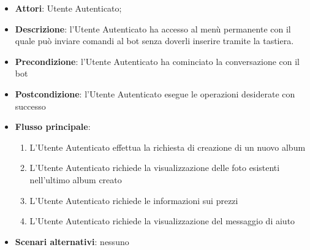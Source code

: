 \begin{itemize}
  \item \textbf{Attori}: Utente Autenticato;
  \item \textbf{Descrizione}: l'Utente Autenticato ha accesso al menù
permanente con il quale può inviare comandi al bot senza doverli inserire
tramite la tastiera.
  \item \textbf{Precondizione}: l'Utente Autenticato ha cominciato la
conversazione con il bot
  \item \textbf{Postcondizione}: l'Utente Autenticato esegue le operazioni
desiderate con successo
  \item \textbf{Flusso principale}:
  \begin{enumerate}
    \item L'Utente Autenticato effettua la richiesta di creazione di un nuovo
album
    \item L'Utente Autenticato richiede la visualizzazione delle foto esistenti
nell'ultimo album creato
    \item L'Utente Autenticato richiede le informazioni sui prezzi
    \item L'Utente Autenticato richiede la visualizzazione del messaggio di
aiuto
  \end{enumerate}
  \item \textbf{Scenari alternativi}: nessuno
\end{itemize}


%

%

